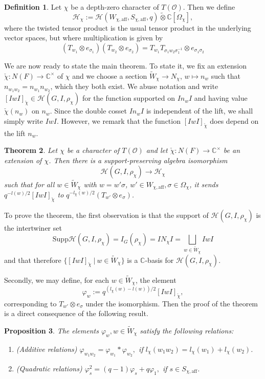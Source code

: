 \documentclass{article}
\newcommand{\aff}{\mathrm{aff}}
\newcommand{\cO}{\mathcal{O}}
\newcommand{\cH}{\mathcal{H}}
\newcommand{\CC}{\mathbb{C}}
\theoremstyle{plain}
\newtheorem{theorem}{Theorem}[section]
\newtheorem{proposition}[theorem]{Proposition}
\theoremstyle{definition}
\newtheorem{definition}[theorem]{Definition}
\begin{document}
    \begin{definition}
        Let $\chi$ be a depth-zero character of $T(\cO)$. Then we define 
        $$\cH_\chi:=\cH(W_{\chi,\aff},S_{\chi,\aff},q)\tilde\otimes\CC[\Omega_\chi],$$ 
        where the twisted tensor product is the usual tensor product in the underlying vector spaces, but where multiplication is given by 
        $$(T_{w_1}\otimes e_{\sigma_1})(T_{w_2}\otimes e_{\sigma_2})=T_{w_1}T_{\sigma_1w_2\sigma_1^{-1}}\otimes e_{\sigma_1\sigma_2}$$
    \end{definition}
    We are now ready to state the main theorem. To state it, we fix an extension $\check{\chi}:N(F)\rightarrow\CC^\times$ of $\chi$ and we choose a section $\tilde{W}_\chi\rightarrow N_\chi$, $w\mapsto n_w$ such that $n_{w_1w_2}=n_{w_1}n_{w_2}$, which they both exist. We abuse notation and write $[IwI]_{\check{\chi}}\in\cH(G,I,\rho_\chi)$ for the function supported on $In_wI$ and having value $\check{\chi}(n_w)$ on $n_w$. Since the double cosset $In_wI$ is independent of the lift, we shall simply write $IwI$. However, we remark that the function $[IwI]_{\check{\chi}}$ does depend on the lift $n_w$.
    \begin{theorem}
        Let $\chi$ be a character of $T(\cO)$ and let $\check{\chi}:N(F)\rightarrow\CC^\times$ be an extension of $\chi$. Then there is a support-preserving algebra isomorphism 
        $$\cH(G,I,\rho_\chi)\longrightarrow\cH_\chi$$
        such that for all $w\in \tilde{W}_\chi$ with $w=w'\sigma$, $w'\in W_{\chi,\aff}, \sigma\in\Omega_\chi$,
        it sends $q^{-l(w)/2}[IwI]_{\check{\chi}}$ to $q^{-l_\chi(w)/2}(T_{w'}\otimes e_\sigma)$.
    \end{theorem}

    To prove the theorem, the first observation is that the support of $\cH(G,I,\rho_\chi)$ is the intertwiner set $$\mathrm{Supp}\cH(G,I,\rho_\chi)=I_G(\rho_\chi)=IN_\chi I=\bigsqcup_{w\in\tilde{W}_\chi}IwI$$ and that therefore $\{[IwI]_{\check{\chi}}\ |\ w\in\tilde{W}_\chi\}$ is a $\CC$-basis for $\cH(G,I,\rho_\chi)$.

    Secondly, we may define, for each $w\in\tilde{W}_\chi$, the element
    $$\varphi_w:=q^{(l_\chi(w)-l(w))/2}[IwI]_{\check{\chi}},$$
    corresponding to $T_{w'}\otimes e_\sigma$ under the isomorphism. Then the proof of the theorem is a direct consequence of the following result.

    \begin{proposition}
        The elements $\varphi_w, w\in\tilde{W}_\chi$ satisfy the following relations:
        \begin{enumerate}
            \item (Additive relations) $\varphi_{w_1w_2}=\varphi_{w_1}*\varphi_{w_2},$ if $l_\chi(w_1w_2)=l_\chi(w_1)+l_\chi(w_2)$.
            \item (Quadratic relations) $\varphi_s^2=(q-1)\varphi_s+q\varphi_1,$ if $s\in S_{\chi,\aff}$. 
        \end{enumerate} 
    \end{proposition}
    
\end{document}
